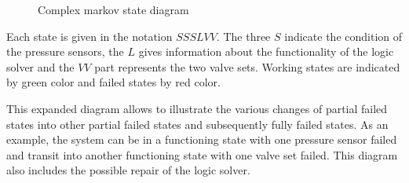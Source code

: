 \begin{figure}[!ht]
\caption{Complex markov state diagram }\label{fig:markov_complex}
\end{figure}

Each state is given in the notation $SSSLVV$. The three $S$ indicate the condition of the pressure sensors, the $L$ gives information about the functionality of the logic solver and the $VV$ part represents the two valve sets. Working states are indicated by green color and failed states by red color.

This expanded diagram allows to illustrate the various changes of partial failed states into other partial failed states and subsequently fully failed states.
As an example, the system can be in a functioning state with one pressure sensor failed and transit into another functioning state with one valve set failed.
This diagram also includes the possible repair of the logic solver.

\newpage




